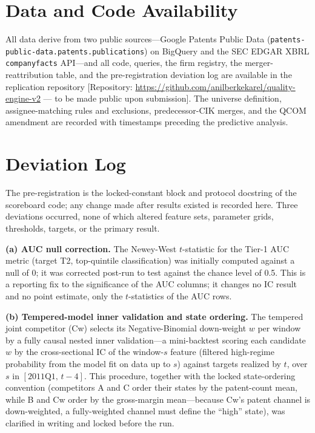 \documentclass[11pt]{article}
\begin{document}



\appendix
\renewcommand{\thesection}{Appendix~\Alph{section}:}

\section{Data and Code Availability}

All data derive from two public sources---Google Patents Public Data (\texttt{patents-\allowbreak public-\allowbreak data.\allowbreak patents.\allowbreak publications}) on BigQuery and the SEC EDGAR XBRL \texttt{companyfacts} API---and all code, queries, the firm registry, the merger-reattribution table, and the pre-registration deviation log are available in the replication repository [Repository: \url{https://github.com/anilberkekarel/quality-engine-v2} --- to be made public upon submission]. The universe definition, assignee-matching rules and exclusions, predecessor-CIK merges, and the QCOM amendment are recorded with timestamps preceding the predictive analysis.

\section{Deviation Log}

The pre-registration is the locked-constant block and protocol docstring of the scoreboard code; any change made after results existed is recorded here. Three deviations occurred, none of which altered feature sets, parameter grids, thresholds, targets, or the primary result.

\textbf{(a) AUC null correction.} The Newey-West $t$-statistic for the Tier-1 AUC metric (target T2, top-quintile classification) was initially computed against a null of 0; it was corrected post-run to test against the chance level of 0.5. This is a reporting fix to the significance of the AUC columns; it changes no IC result and no point estimate, only the $t$-statistics of the AUC rows.

\textbf{(b) Tempered-model inner validation and state ordering.} The tempered joint competitor (Cw) selects its Negative-Binomial down-weight $w$ per window by a fully causal nested inner validation---a mini-backtest scoring each candidate $w$ by the cross-sectional IC of the window-$s$ feature (filtered high-regime probability from the model fit on data up to $s$) against targets realized by $t$, over $s$ in $[\text{2011Q1},\, t-4]$. This procedure, together with the locked state-ordering convention (competitors A and C order their states by the patent-count mean, while B and Cw order by the gross-margin mean---because Cw's patent channel is down-weighted, a fully-weighted channel must define the ``high'' state), was clarified in writing and locked before the run.
\end{document}
